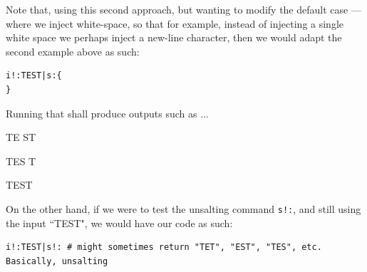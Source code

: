 \documentclass[a4paper, 18pt]{book} %
\begin{document}
{{{\vspace{1em}

Note that, using this second approach, but wanting to modify the default case --- where we inject white-space, so that for example, instead of injecting a single white space we perhaps inject a new-line character, then we would adapt the second example above as such:


\vspace{1em}

  \begin{tcolorbox}[teaterminalstyle, title=S: EXAMPLE 3: Salting using S:SALT, breakable]
  \begin{lstlisting}[language=TEA,breaklines=true,]
i!:TEST|s:{
}
   \end{lstlisting}
  \end{tcolorbox}

\vspace{1em}

Running that shall produce outputs such as ...


  \begin{tcbverbatim}[title=Output from Example 3]
TE
ST
  \end{tcbverbatim}
  
    \begin{tcbverbatim}[title=Output from Example 3]
TES
T
  \end{tcbverbatim}


    \begin{tcbverbatim}[title=Output from Example 3]

TEST
  \end{tcbverbatim}
  
  
  \vspace{2em}
  
  On the other hand, if we were to test the unsalting command \texttt{s!:}, and still using the input ``TEST", we would have our code as such:
  
  
  \vspace{1em}

  \begin{tcolorbox}[teaterminalstyle, title=S: EXAMPLE 4: Unsalting using S!:, breakable]
  \begin{lstlisting}[language=TEA,breaklines=true,]
i!:TEST|s!: # might sometimes return "TET", "EST", "TES", etc. Basically, unsalting
   \end{lstlisting}
  \end{tcolorbox}

\vspace{1em}
  
}}}
\end{document}

